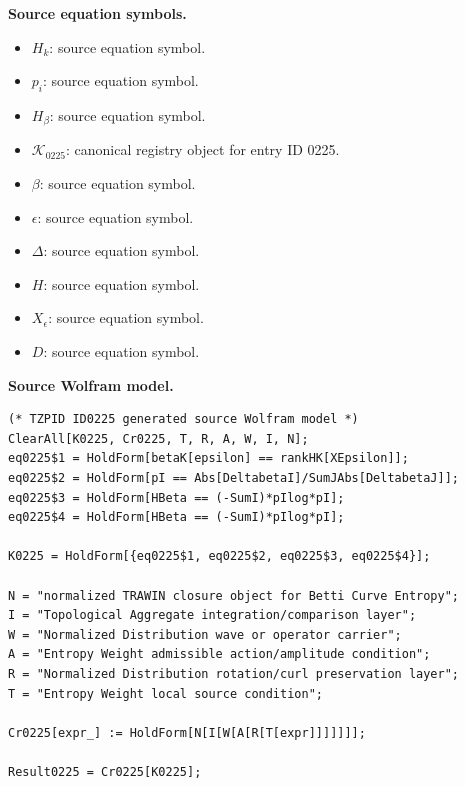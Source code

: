 \begin{minipage}[t]{0.49\linewidth}
\begingroup
\small
\raggedright
\textbf{Source equation symbols.}\par
\begin{itemize}[leftmargin=1.35em,itemsep=1pt,topsep=1pt,parsep=0pt]
    \item $H_k$: source equation symbol.
    \item $p_i$: source equation symbol.
    \item $H_{\beta}$: source equation symbol.
    \item $\mathcal{K}_{0225}$: canonical registry object for entry ID 0225.
    \item $\beta$: source equation symbol.
    \item $\epsilon$: source equation symbol.
    \item $\Delta$: source equation symbol.
    \item $H$: source equation symbol.
    \item $X_{\epsilon}$: source equation symbol.
    \item $D$: source equation symbol.
\end{itemize}
\endgroup
\end{minipage}\hfill
\begin{minipage}[t]{0.47\linewidth}
\begingroup
\scriptsize
\raggedright
\textbf{Source Wolfram model.}\par
\begin{Verbatim}[fontsize=\tiny,breaklines=true,breakanywhere=true]
(* TZPID ID0225 generated source Wolfram model *)
ClearAll[K0225, Cr0225, T, R, A, W, I, N];
eq0225$1 = HoldForm[betaK[epsilon] == rankHK[XEpsilon]];
eq0225$2 = HoldForm[pI == Abs[DeltabetaI]/SumJAbs[DeltabetaJ]];
eq0225$3 = HoldForm[HBeta == (-SumI)*pIlog*pI];
eq0225$4 = HoldForm[HBeta == (-SumI)*pIlog*pI];

K0225 = HoldForm[{eq0225$1, eq0225$2, eq0225$3, eq0225$4}];

N = "normalized TRAWIN closure object for Betti Curve Entropy";
I = "Topological Aggregate integration/comparison layer";
W = "Normalized Distribution wave or operator carrier";
A = "Entropy Weight admissible action/amplitude condition";
R = "Normalized Distribution rotation/curl preservation layer";
T = "Entropy Weight local source condition";

Cr0225[expr_] := HoldForm[N[I[W[A[R[T[expr]]]]]]];

Result0225 = Cr0225[K0225];
\end{Verbatim}
\endgroup
\end{minipage}


